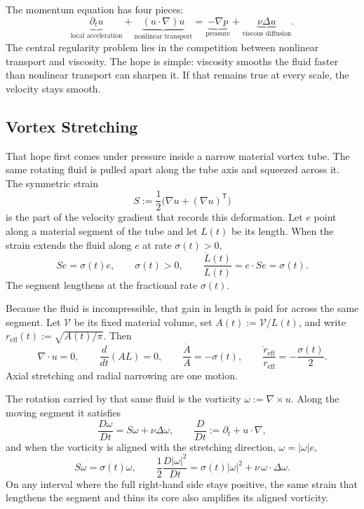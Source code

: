 
The momentum equation has four pieces:
\[
  \underbrace{\partial_t u}_{\text{local acceleration}}
  +
  \underbrace{(u\cdot\nabla)u}_{\text{nonlinear transport}}
  =
  \underbrace{-\nabla p}_{\text{pressure}}
  +
  \underbrace{\nu\Delta u}_{\text{viscous diffusion}}.
\]
The central regularity problem lies in the competition between nonlinear transport and viscosity.
The hope is simple: viscosity smooths the fluid faster than nonlinear transport can sharpen it.
If that remains true at every scale, the velocity stays smooth.

\subsection{Vortex Stretching}\label{sub:ThePerfectlyStretchingVortex}

That hope first comes under pressure inside a narrow material vortex tube. The same rotating fluid is pulled apart along the tube axis and squeezed across it. The symmetric strain
\[
  S:=\frac12\bigl(\nabla u+(\nabla u)^{\mathsf T}\bigr)
\]
is the part of the velocity gradient that records this deformation. Let \(e\) point along a material segment of the tube and let \(L(t)\) be its length. When the strain extends the fluid along \(e\) at rate \(\sigma(t)>0\),
\[
  Se=\sigma(t)e,
  \qquad
  \sigma(t)>0,
  \qquad
  \frac{\dot L(t)}{L(t)}
  =
  e\cdot Se
  =
  \sigma(t).
\]
The segment lengthens at the fractional rate \(\sigma(t)\).

Because the fluid is incompressible, that gain in length is paid for across the same segment. Let \(\mathcal V\) be its fixed material volume, set \(A(t):=\mathcal V/L(t)\), and write \(r_{\mathrm{eff}}(t):=\sqrt{A(t)/\pi}\). Then
\[
  \nabla\cdot u=0,
  \qquad
  \frac{d}{dt}(A L)=0,
  \qquad
  \frac{\dot A}{A}=-\sigma(t),
  \qquad
  \frac{\dot r_{\mathrm{eff}}}{r_{\mathrm{eff}}}
  =
  -\frac{\sigma(t)}{2}.
\]
Axial stretching and radial narrowing are one motion.

The rotation carried by that same fluid is the vorticity \(\omega:=\nabla\times u\). Along the moving segment it satisfies
\[
  \frac{D\omega}{Dt}
  =
  S\omega+\nu\Delta\omega,
  \qquad
  \frac{D}{Dt}
  :=
  \partial_t+u\cdot\nabla,
\]
and when the vorticity is aligned with the stretching direction, \(\omega=|\omega|e\),
\[
  S\omega
  =
  \sigma(t)\omega,
  \qquad
  \frac12\frac{D|\omega|^2}{Dt}
  =
  \sigma(t)|\omega|^2
  +
  \nu\,\omega\cdot\Delta\omega.
\]
On any interval where the full right-hand side stays positive, the same strain that lengthens the segment and thins its core also amplifies its aligned vorticity.

